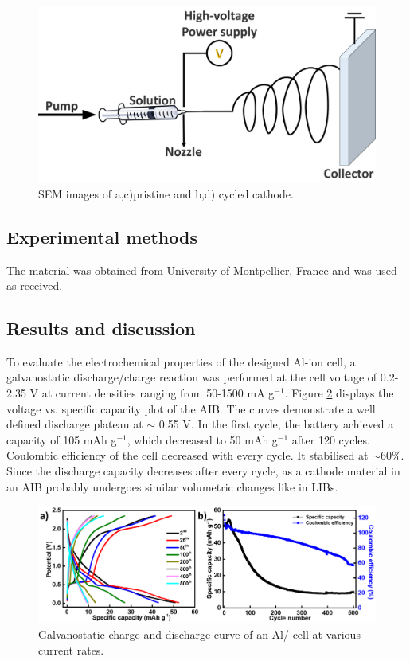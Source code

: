 \begin{figure}[th!]
\centering
\includegraphics[width=\textwidth]{Figures/chap6fig/electrospinning}
\caption{SEM images of a,c)pristine and b,d) cycled  cathode.}
\label{Figures/chap6fig:electrospinning}
\end{figure}

\subsection{Experimental methods}
The material was obtained from University of Montpellier, France and was used as received. 

\subsection{Results and discussion}
To evaluate the electrochemical properties of the designed Al-ion cell, a galvanostatic discharge/charge reaction was performed at the cell voltage of 0.2-2.35 V at current densities ranging from 50-1500 mA g$^{-1}$. Figure \ref{Figures/chap6fig:SnO2newCDC} displays the voltage vs. specific capacity plot of the AIB. The curves demonstrate a well defined discharge plateau at $\sim$ 0.55 V. In the first cycle, the battery achieved a capacity of 105 mAh g$^{-1}$, which decreased to 50 mAh g$^{-1}$ after 120 cycles. Coulombic efficiency of the cell decreased with every cycle. It stabilised at $\sim$60\%. Since the discharge capacity decreases after every cycle, as a cathode material in an AIB probably undergoes similar volumetric changes like in LIBs.   

 \begin{figure}[th!]
  \centering
  \includegraphics[width=\textwidth]{Figures/chap6fig/SnO2newCDC}
    \caption{Galvanostatic charge and discharge curve of an Al/ cell at various current rates.}
  \label{Figures/chap6fig:SnO2newCDC}
\end{figure}

